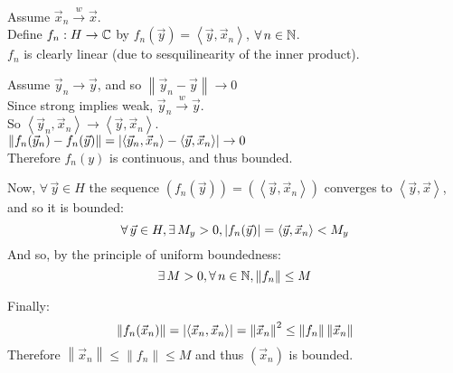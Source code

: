 \documentclass[letterpaper,12pt,fleqn]{article}
\newcommand{\vx}{\vec{x}}
\newcommand{\vy}{\vec{y}}
\newcommand{\norm}[1]{\left\|#1\right\|}
\newcommand{\inner}[1]{\left<#1\right>}
\newcommand{\weak}{\overset{w}{\longrightarrow}}
\begin{document}
\begin{theproof}
  Assume $\vx_n\weak\vx$. \\
  Define $f_n:H\to\mathbb{C}$ by $f_n(\vy)=\inner{\vy,\vx_n}$, $\forall\,n\in\mathbb{N}$. \\
  $f_n$ is clearly linear (due to sesquilinearity of the inner product).

  Assume $\vy_n\to\vy$, and so $\norm{\vy_n-\vy}\to0$ \\
  Since strong implies weak, $\vy_n\weak\vy$. \\
  So $\inner{\vy_n,\vx_n}\to\inner{\vy,\vx_n}$. \\
  $\norm{f_n(\vy_n)-f_n(\vy)}=\abs{\inner{\vy_n,\vx_n}-\inner{\vy,\vx_n}}
  \to0$ \\
  Therefore $f_n(y)$ is continuous, and thus bounded.

  Now, $\forall\,\vy\in H$ the sequence $(f_n(\vy))=(\inner{\vy,\vx_n})$
  converges to $\inner{\vy,\vx}$, and so it is bounded:
  \[\forall\,\vy\in H,\exists\,M_y>0,\abs{f_n(\vy)}=\inner{\vy,\vx_n}<M_y\]
  And so, by the principle of uniform boundedness:
  \[\exists\,M>0,\forall\,n\in\N,\norm{f_n}\le M\]

  Finally:
  \[\norm{f_n(\vx_n)}=\abs{\inner{\vx_n,\vx_n}}=\norm{\vx_n}^2\le
  \norm{f_n}\norm{\vx_n}\]
  Therefore $\norm{\vx_n}\le\norm{f_n}\le M$ and thus $(\vx_n)$ is bounded.
\end{theproof}
\end{document}
